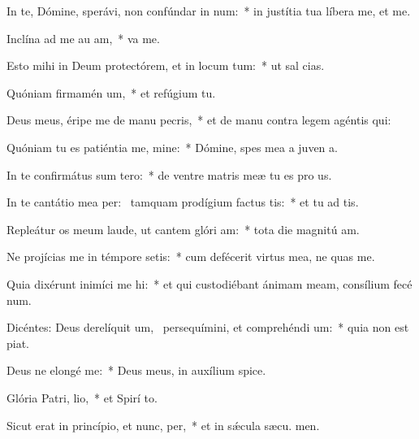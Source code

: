 \item In te, Dómine, sperávi, non confúndar in num:~* in justítia tua líbera me, et  me.
\item Inclína ad me au am,~*  va me.
\item Esto mihi in Deum protectórem, et in locum tum:~* ut sal  cias.
\item Quóniam firmamén um,~* et refúgium   tu.
\item Deus meus, éripe me de manu pecris,~* et de manu contra legem agéntis  qui:
\item Quóniam tu es patiéntia me, mine:~* Dómine, spes mea a juven a.
\item In te confirmátus sum  tero:~* de ventre matris meæ tu es pro us.
\item In te cantátio mea per:~\pscross{} tamquam prodígium factus  tis:~* et tu ad tis.
\item Repleátur os meum laude, ut cantem glóri am:~* tota die magnitú am.
\item Ne projícias me in témpore setis:~* cum defécerit virtus mea, ne quas me.
\item Quia dixérunt inimíci me hi:~* et qui custodiébant ánimam meam, consílium fecé  num.
\item Dicéntes: Deus derelíquit um,~\pscross{} persequímini, et comprehéndi um:~* quia non est  piat.
\item Deus ne elongé  me:~* Deus meus, in auxílium  spice.
\item Glória Patri,  lio,~* et Spirí to.
\item Sicut erat in princípio, et nunc,  per,~* et in sǽcula sæcu. men.
